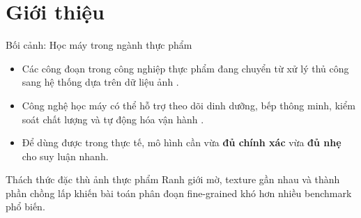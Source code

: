 \section{Giới thiệu}

\begin{frame}{Bối cảnh: Học máy trong ngành thực phẩm}
      \begin{itemize}
        \item Các công đoạn trong công nghiệp thực phẩm đang chuyển từ xử lý thủ công sang hệ thống dựa trên dữ liệu ảnh \cite{mahalik2010trends,stemmer2018vision}.
        \item Công nghệ học máy có thể hỗ trợ theo dõi dinh dưỡng, bếp thông minh, kiểm soát chất lượng và tự động hóa vận hành \cite{gao2019smartfridge,wang2019smartrefrigerator}.
        \item Để dùng được trong thực tế, mô hình cần vừa \textbf{đủ chính xác} vừa \textbf{đủ nhẹ} cho suy luận nhanh.
      \end{itemize}

      \begin{block}{Thách thức đặc thù ảnh thực phẩm}
        Ranh giới mờ, texture gần nhau và thành phần chồng lấp khiến bài toán phân đoạn fine-grained khó hơn nhiều benchmark phổ biến.
      \end{block}
    
\end{frame}

